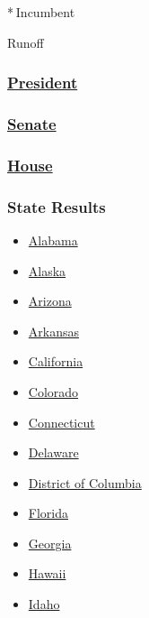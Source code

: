 * Incumbent~

 Runoff

\hypertarget{president-1}{%
\subsubsection{\texorpdfstring{\href{//www.nytimes3xbfgragh.onion/elections/2016/results/president}{President}}{President}}\label{president-1}}

\hypertarget{senate}{%
\subsubsection{\texorpdfstring{\href{//www.nytimes3xbfgragh.onion/elections/2016/results/senate}{Senate}}{Senate}}\label{senate}}

\hypertarget{house}{%
\subsubsection{\texorpdfstring{\href{//www.nytimes3xbfgragh.onion/elections/2016/results/house}{House}}{House}}\label{house}}

\hypertarget{state-results}{%
\subsubsection{State Results}\label{state-results}}

\begin{itemize}
\tightlist
\item
  \href{//www.nytimes3xbfgragh.onion/elections/2016/results/alabama}{Alabama}
\item
  \href{//www.nytimes3xbfgragh.onion/elections/2016/results/alaska}{Alaska}
\item
  \href{//www.nytimes3xbfgragh.onion/elections/2016/results/arizona}{Arizona}
\item
  \href{//www.nytimes3xbfgragh.onion/elections/2016/results/arkansas}{Arkansas}
\item
  \href{//www.nytimes3xbfgragh.onion/elections/2016/results/california}{California}
\item
  \href{//www.nytimes3xbfgragh.onion/elections/2016/results/colorado}{Colorado}
\item
  \href{//www.nytimes3xbfgragh.onion/elections/2016/results/connecticut}{Connecticut}
\item
  \href{//www.nytimes3xbfgragh.onion/elections/2016/results/delaware}{Delaware}
\item
  \href{//www.nytimes3xbfgragh.onion/elections/2016/results/district-of-columbia}{District
  of Columbia}
\item
  \href{//www.nytimes3xbfgragh.onion/elections/2016/results/florida}{Florida}
\item
  \href{//www.nytimes3xbfgragh.onion/elections/2016/results/georgia}{Georgia}
\item
  \href{//www.nytimes3xbfgragh.onion/elections/2016/results/hawaii}{Hawaii}
\item
  \href{//www.nytimes3xbfgragh.onion/elections/2016/results/idaho}{Idaho}
\end{itemize}

